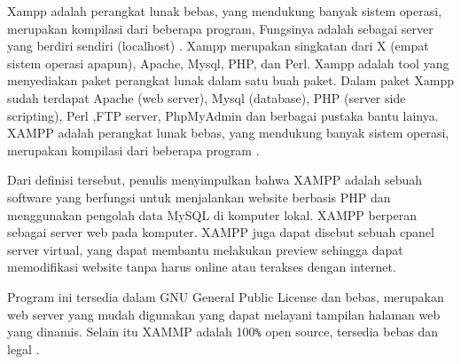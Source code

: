 Xampp adalah perangkat lunak bebas, yang mendukung banyak sistem operasi, merupakan kompilasi dari beberapa program,  Fungsinya adalah sebagai server yang berdiri sendiri (localhost) \cite{siregar2018rancang}. Xampp merupakan singkatan dari X (empat sistem operasi apapun), Apache, Mysql, PHP, dan Perl. Xampp adalah tool yang menyediakan paket perangkat lunak dalam satu buah paket. Dalam paket Xampp sudah terdapat Apache (web server), Mysql (database), PHP (server side scripting), Perl ,FTP server, PhpMyAdmin dan berbagai pustaka bantu lainya. XAMPP adalah perangkat lunak bebas, yang mendukung banyak sistem operasi, merupakan kompilasi dari beberapa program \cite{sugiarto2019aplikasi}.

Dari definisi tersebut, penulis menyimpulkan bahwa XAMPP adalah sebuah software yang berfungsi untuk menjalankan website berbasis PHP dan menggunakan pengolah data MySQL di komputer lokal. XAMPP berperan sebagai server web pada komputer. XAMPP juga dapat disebut sebuah cpanel server virtual, yang dapat membantu melakukan preview sehingga dapat memodifikasi website tanpa harus online atau terakses dengan internet.

Program ini tersedia dalam GNU General Public License dan bebas,
merupakan web server yang mudah digunakan yang dapat melayani tampilan
halaman web yang dinamis. Selain itu XAMMP adalah 100\verb|%| open source, tersedia bebas dan legal \cite{siregar2017perancangan}.

